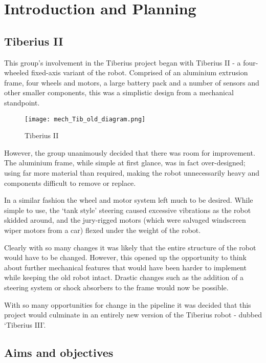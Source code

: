 \section{Introduction and Planning}
\subsection{Tiberius II}

This group's involvement in the Tiberius project began with Tiberius II - a four-wheeled fixed-axis variant of the robot. Comprised of an aluminium extrusion frame, four wheels and motors, a large battery pack and a number of sensors and other smaller components, this was a simplistic design from a mechanical standpoint.

\begin{figure}[!htb]
\begin{center}
\texttt{[image: mech\_Tib\_old\_diagram.png]}
\end{center}
\caption{Tiberius II}
\label{fig:mech_old}
\end{figure}

However, the group unanimously decided that there was room for improvement. The aluminium frame, while simple at first glance, was in fact over-designed; using far more material than required, making the robot unnecessarily heavy and components difficult to remove or replace.

In a similar fashion the wheel and motor system left much to be desired. While simple to use, the `tank style' steering caused excessive vibrations as the robot skidded around, and the jury-rigged motors (which were salvaged windscreen wiper motors from a car) flexed under the weight of the robot.

Clearly with so many changes it was likely that the entire structure of the robot would have to be changed. However, this opened up the opportunity to think about further mechanical features that would have been harder to implement while keeping the old robot intact. Drastic changes such as the addition of a steering system or shock absorbers to the frame would now be possible.

With so many opportunities for change in the pipeline it was decided that this project would culminate in an entirely new version of the Tiberius robot - dubbed `Tiberius III'.
\subsection{Aims and objectives}

